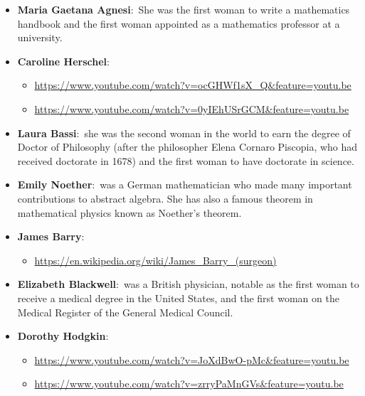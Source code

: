 \documentclass[11pt,a4paper]{article}
\begin{document}
\begin{itemize}
\begin{itemize}
    \end{itemize}
    \item \textbf{Maria Gaetana Agnesi}:\ She was the first woman to write a mathematics handbook and the first woman appointed as a mathematics professor at a university.
    \item \textbf{Caroline Herschel}:\ 
    \begin{itemize}
      \item[] \url{https://www.youtube.com/watch?v=ocGHWf1sX_Q&feature=youtu.be}
      \item[] \url{https://www.youtube.com/watch?v=0yIEhUSrGCM&feature=youtu.be}  
    \end{itemize} 
    \item \textbf{Laura Bassi}:\ she was the second woman in the world to earn the degree of Doctor of Philosophy (after the philosopher Elena Cornaro Piscopia, who had received 
    doctorate in 1678) and the first woman to have doctorate in science.
    \item \textbf{Emily Noether}:\ was a German mathematician who made many important contributions to abstract algebra. She has also a famous theorem in mathematical physics known 
    as Noether's theorem.
    \item \textbf{James Barry}:\ 
    \begin{itemize}
      \item[] \url{https://en.wikipedia.org/wiki/James_Barry_(surgeon)} 
    \end{itemize}
    \item \textbf{Elizabeth Blackwell}:\ was a British physician, notable as the first woman to receive a medical degree in the United States, and the first woman on the Medical Register 
    of the General Medical Council.
    \item \textbf{Dorothy Hodgkin}:\
    \begin{itemize}
      \item[] \url{https://www.youtube.com/watch?v=JoXdBwO-pMc&feature=youtu.be}
      \item[] \url{https://www.youtube.com/watch?v=zrryPaMnGVs&feature=youtu.be} 
    \end{itemize}
  \end{itemize}
\end{document}

